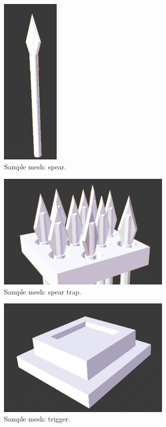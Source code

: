 \documentclass[12pt, titlepage]{article}
\begin{document}
\begin{figure}[hB]
\begin{center}
\includegraphics[width=0.25\textwidth]{spear}
\caption{Sample mesh:  spear.} \label{fig:spear}
\end{center}
\end{figure}

\begin{figure}[hB]
\begin{center}
\includegraphics[width=0.75\textwidth]{speartrap}
\caption{Sample mesh:  spear trap.} \label{fig:speartrap}
\end{center}
\end{figure}

\begin{figure}[hB]
\begin{center}
\includegraphics[width=0.75\textwidth]{trigger}
\caption{Sample mesh:  trigger.} \label{fig:trigger}
\end{center}
\end{figure}
\end{document}
